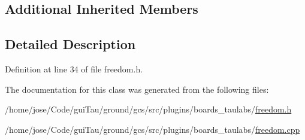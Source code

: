 \subsection*{Additional Inherited Members}


\subsection{Detailed Description}


Definition at line 34 of file freedom.\-h.



The documentation for this class was generated from the following files\-:\begin{DoxyCompactItemize}
\item 
/home/jose/\-Code/gui\-Tau/ground/gcs/src/plugins/boards\-\_\-taulabs/\hyperlink{freedom_8h}{freedom.\-h}\item 
/home/jose/\-Code/gui\-Tau/ground/gcs/src/plugins/boards\-\_\-taulabs/\hyperlink{freedom_8cpp}{freedom.\-cpp}\end{DoxyCompactItemize}
